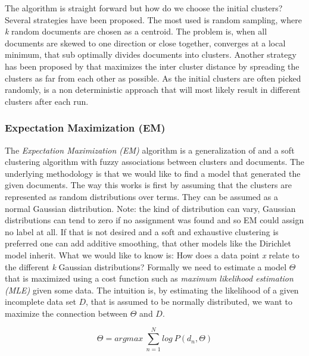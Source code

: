     The \kmeans{} algorithm is straight forward but how do we choose the initial clusters? Several strategies have been proposed. The most used is random sampling, where \emph{k} random documents are chosen as a centroid. The problem is, when all documents are skewed to one direction or close together, \kmeans{} converges at a local minimum, that sub optimally divides documents into clusters.
    Another strategy has been proposed by \cite{KMeansPlusPlus2007} that maximizes the inter cluster distance by spreading the clusters as far from each other as possible. 
    As the initial clusters are often picked randomly, \kmeans{} is a non deterministic approach that will most likely result in different clusters after each run.

    \subsubsection{Expectation Maximization (EM)}
    \label{sec:em}

    The \emph{Expectation Maximization (EM)} algorithm is a generalization of \kmeans{} and a soft clustering algorithm with fuzzy associations between clusters and documents. The underlying methodology is that we would like to find a model that generated the given documents. The way this works is first by assuming that the clusters are represented as random distributions over terms. They can be assumed as a normal Gaussian distribution. Note: the kind of distribution can vary, Gaussian distributions can tend to zero if no assignment was found and so EM could assign no label at all. If that is not desired and a soft and exhaustive clustering is preferred one can add additive smoothing, that other models like the Dirichlet model inherit. What we would like to know is: How does a data point \emph{x} relate to the different \emph{k} Gaussian distributions? Formally we need to estimate a model $\Theta$ that is maximized using a cost function such as \emph{maximum likelihood estimation (MLE)} given some data. The intuition is, by estimating the likelihood of a given incomplete data set $D$, that is assumed to be normally distributed, we want to maximize the connection between $\Theta$ and $D$.

      \begin{equation}
        \Theta = argmax\:\sum_{n=1}^{N}log\:P(d_n,\Theta)
      \end{equation}

